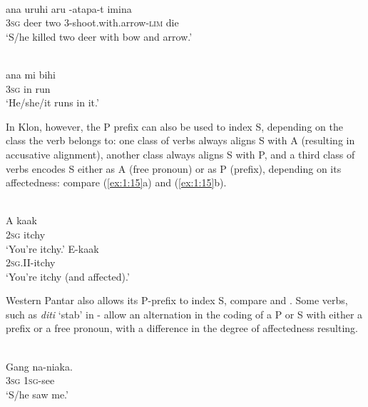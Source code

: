 \ea%
\label{ex:1:13}
\\
\gll {\textglotstop}ana   uruhi{\ng}  aru {\textglotstop}-atapa-t       imina \\
 3\textsc{sg}  deer   two 3-shoot.with.arrow-\textsc{lim}  die  \\
\glt `S/he killed two deer with bow and arrow.'
\z







\ea%
\label{ex:1:14}
\\
\gll {\textglotstop}ana  mi   bihi  \\
3\textsc{sg}  in  run   \\
\glt `He/she/it runs in it.'
\z







In Klon, however, the P prefix can also be used to index S, depending on the class the verb belongs to: one class of verbs always aligns S with A (resulting in accusative alignment), another class always aligns S with P, and a third class of verbs encodes S either as A (free pronoun) or as P (prefix), depending on its affectedness: compare (\ref{ex:1:15}a) and (\ref{ex:1:15}b).



\ea%
\label{ex:1:15}
 \\
\ea
\gll A  kaak \\
 \textsc{2sg} itchy      \\
\glt `You're itchy.'
\ex
\gll E-kaak \\
  \textsc{2sg.II}{}-itchy   \\
\glt `You're itchy (and affected).' 
\z\z
 


Western Pantar also allows its P-prefix to index S, compare  and .  Some verbs, such as \textit{diti} `stab' in - allow an alternation in the coding of a P or S with either a prefix or a free pronoun, with a difference in the degree of affectedness resulting. 


\ea%
\label{ex:1:16}
 \\
\gll Gang  na-niaka. \\
 3\textsc{sg}  \textsc{1sg}{}-see      \\
\glt `S/he saw me.' 
\z
 

